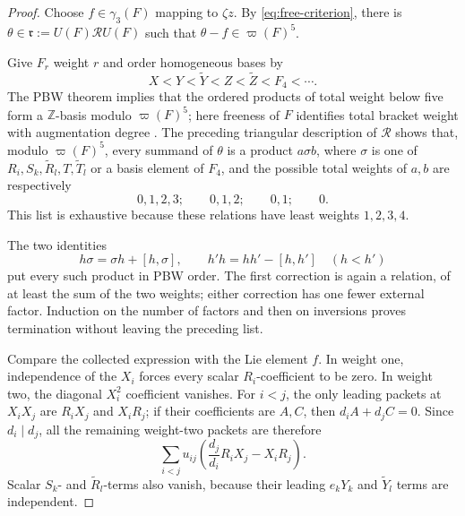 \documentclass[11pt]{amsart}
\theoremstyle{remark}
\newcommand{\Z}{\mathbb Z}
\newcommand{\gm}{\gamma}
\newcommand{\aug}{\varpi}
\begin{document}
\begin{proof}
Choose $f\in\gm_3(F)$ mapping to $\zeta z$.  By
\eqref{eq:free-criterion}, there is
$\theta\in\mathfrak r:=U(F)\mathcal R U(F)$ such that
$\theta-f\in\aug(F)^5$.

Give $F_r$ weight $r$ and order homogeneous bases by
\[
 X<Y<\widetilde Y<Z<\widetilde Z<F_4<\cdots.
\]
The PBW theorem implies that the ordered products of total weight
below five form a $\Z$-basis modulo $\aug(F)^5$; here freeness of
$F$ identifies total bracket weight with augmentation degree
\cite[Ch.~I, \S2.7]{Bou}.
The preceding triangular description of $\mathcal R$ shows that,
modulo $\aug(F)^5$, every summand of $\theta$ is a product
$a\sigma b$, where $\sigma$ is one of
$R_i,S_k,\widetilde R_l,T,\widetilde T_l$ or a basis element of
$F_4$, and the possible total weights of $a,b$ are respectively
\[
 0,1,2,3;\qquad 0,1,2;\qquad 0,1;\qquad 0.
\]
This list is exhaustive because these relations have least weights
$1,2,3,4$.

The two identities
\begin{equation}\label{eq:collection-identities}
 h\sigma=\sigma h+[h,\sigma],
 \qquad h'h=hh'-[h,h']\quad(h<h')
\end{equation}
put every such product in PBW order.  The first correction is again a
relation, of at least the sum of the two weights; either correction has
one fewer external factor.  Induction on the number of factors and
then on inversions proves termination without leaving the preceding
list.

Compare the collected expression with the Lie element $f$.
In weight one, independence of the $X_i$ forces every scalar
$R_i$-coefficient to be zero.  In weight two, the diagonal $X_i^2$
coefficient vanishes.  For $i<j$, the only leading packets at
$X_iX_j$ are $R_iX_j$ and $X_iR_j$; if their coefficients are $A,C$,
then $d_iA+d_jC=0$.  Since $d_i\mid d_j$, all the remaining
weight-two packets are therefore
\begin{equation}\label{eq:Theta2}
 \sum_{i<j}u_{ij}
 \left(\frac{d_j}{d_i}R_iX_j-X_iR_j\right).
\end{equation}
Scalar $S_k$- and $\widetilde R_l$-terms also vanish, because their
leading $e_kY_k$ and $\widetilde Y_l$ terms are independent.


\end{proof}
\end{document}
